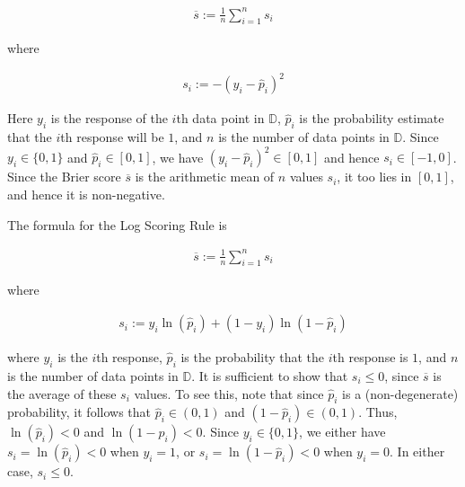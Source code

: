 \documentclass[12pt]{article}
\begin{document}
\begin{enumerate}
\begin{align*}
	\overline{s} := \frac{1}{n} \sum_{i = 1}^{n}s_i
\end{align*}

where

\begin{align*}
	s_i := -(y_i - \hat{p}_i)^2
\end{align*}

Here $y_i$ is the response of the $i$th data point in $\mathbb{D}$, $\hat{p}_i$
is the probability estimate that the $i$th response will be $1$, and $n$ is
the number of data points in $\mathbb{D}$. Since $y_i \in \{0, 1\}$ and
$\hat{p}_i \in [0, 1]$, we have $(y_i - \hat{p}_i)^2\in [0, 1]$ and hence
$s_i \in [-1, 0]$. Since the Brier score $\overline{s}$ is the arithmetic mean
of $n$ values $s_i$, it too lies in $[0, 1]$, and hence it is non-negative.


The formula for the Log Scoring Rule is

\begin{align*}
	\overline{s} := \frac{1}{n} \sum_{i=1}^{n}s_i
\end{align*}

where

\begin{align*}
	s_i := y_i \ln(\hat{p}_i) + (1 - y_i) \ln(1 - \hat{p}_i)
\end{align*}

where $y_i$ is the $i$th response, $\hat{p}_i$ is the probability that the $i$th
response is $1$, and $n$ is the number of data points in $\mathbb{D}$. It is
sufficient to show that $s_i \leq 0$, since $\overline{s}$ is the average
of these $s_i$ values. To see this, note that since $\hat{p}_i$ is a
(non-degenerate) probability, it follows that $\hat{p}_i\in (0, 1)$ and
$(1 - \hat{p}_i) \in (0, 1)$. Thus, $\ln(\hat{p}_i) < 0$ and $\ln(1 - \hat{p}_i) < 0$.
Since $y_i\in \{0, 1\}$, we either have $s_i = \ln(\hat{p}_i)<0$ when $y_i=1$,
or $s_i = \ln(1 - \hat{p}_i)<0$ when $y_i=0$. In either case, $s_i \leq 0$.



\end{enumerate}
\end{document}
